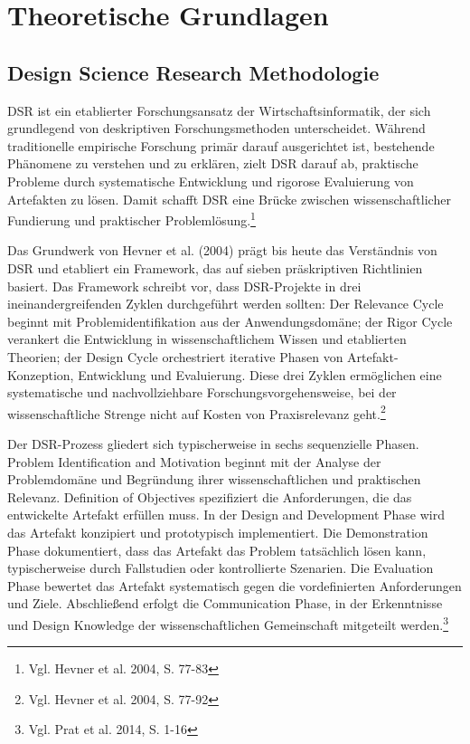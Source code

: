 \chapter{Theoretische Grundlagen}

\section{Design Science Research Methodologie}

\ac{DSR} ist ein etablierter Forschungsansatz der Wirtschaftsinformatik, der sich grundlegend von deskriptiven Forschungsmethoden unterscheidet. Während traditionelle empirische Forschung primär darauf ausgerichtet ist, bestehende Phänomene zu verstehen und zu erklären, zielt \ac{DSR} darauf ab, praktische Probleme durch systematische Entwicklung und rigorose Evaluierung von Artefakten zu lösen. Damit schafft \ac{DSR} eine Brücke zwischen wissenschaftlicher Fundierung und praktischer Problemlösung.\footnote{Vgl. Hevner et al. 2004, S. 77-83}

Das Grundwerk von Hevner et al. (2004) prägt bis heute das Verständnis von \ac{DSR} und etabliert ein Framework, das auf sieben präskriptiven Richtlinien basiert. Das Framework schreibt vor, dass \ac{DSR}-Projekte in drei ineinandergreifenden Zyklen durchgeführt werden sollten: Der Relevance Cycle beginnt mit Problemidentifikation aus der Anwendungsdomäne; der Rigor Cycle verankert die Entwicklung in wissenschaftlichem Wissen und etablierten Theorien; der Design Cycle orchestriert iterative Phasen von Artefakt-Konzeption, Entwicklung und Evaluierung. Diese drei Zyklen ermöglichen eine systematische und nachvollziehbare Forschungsvorgehensweise, bei der wissenschaftliche Strenge nicht auf Kosten von Praxisrelevanz geht.\footnote{Vgl. Hevner et al. 2004, S. 77-92}

Der \ac{DSR}-Prozess gliedert sich typischerweise in sechs sequenzielle Phasen. Problem Identification and Motivation beginnt mit der Analyse der Problemdomäne und Begründung ihrer wissenschaftlichen und praktischen Relevanz. Definition of Objectives spezifiziert die Anforderungen, die das entwickelte Artefakt erfüllen muss. In der Design and Development Phase wird das Artefakt konzipiert und prototypisch implementiert. Die Demonstration Phase dokumentiert, dass das Artefakt das Problem tatsächlich lösen kann, typischerweise durch Fallstudien oder kontrollierte Szenarien. Die Evaluation Phase bewertet das Artefakt systematisch gegen die vordefinierten Anforderungen und Ziele. Abschließend erfolgt die Communication Phase, in der Erkenntnisse und Design Knowledge der wissenschaftlichen Gemeinschaft mitgeteilt werden.\footnote{Vgl. Prat et al. 2014, S. 1-16}

